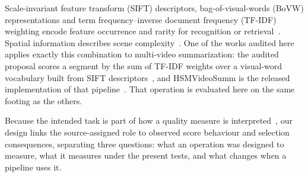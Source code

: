 Scale-invariant feature transform (SIFT) descriptors, bag-of-visual-words (BoVW) representations and term frequency--inverse document frequency (TF-IDF) weighting encode feature occurrence and rarity for recognition or retrieval~\citep{csurka2004bovw,lowe2004sift,salton1988tfidf,sivic2003videogoogle}. Spatial information describes scene complexity~\citep{itu_p910,robitza2021siti}. One of the works audited here applies exactly this combination to multi-video summarization: the audited proposal scores a segment by the sum of TF-IDF weights over a visual-word vocabulary built from SIFT descriptors~\citep{barbieri2021tese}, and HSMVideoSumm is the released implementation of that pipeline~\citep{moraes2024hsmvideosumm}. That operation is evaluated here on the same footing as the others.

Because the intended task is part of how a quality measure is interpreted~\citep{leszczuk2014taskbased}, our design links the source-assigned role to observed score behaviour and selection consequences, separating three questions: what an operation was designed to measure, what it measures under the present tests, and what changes when a pipeline uses it.
